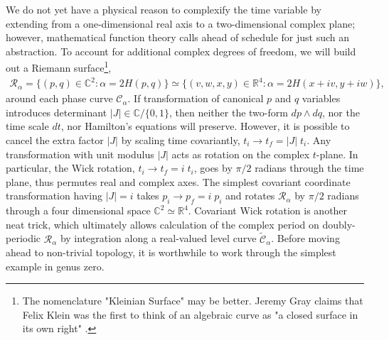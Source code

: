 \documentclass[nofootinbib,preprint]{revtex4-1}
\begin{document}
We do not yet have a physical reason to complexify the time variable by extending from a one-dimensional
real axis to a two-dimensional complex plane; however, mathematical function theory calls ahead of 
schedule for just such an abstraction. To account for additional complex degrees of freedom, we will build 
out a Riemann surface\footnote{The nomenclature "Kleinian Surface" may be better. Jeremy Gray claims that 
Felix Klein was the first to think of an algebraic curve as "a closed surface in its own right" \cite{GRAY2010}. }, 
\begin{eqnarray}
\mathcal{R}_{\alpha} = \{(p,q) \in \mathbb{C}^2: \alpha=2H(p,q) \} 
\simeq \{(v,w,x,y) \in \mathbb{R}^4: \alpha=2H(x+i v,y+i w) \},\nonumber
\end{eqnarray}
around each phase curve $\mathcal{C}_{\alpha}$. If transformation of canonical $p$ and $q$ 
variables introduces determinant $|J| \in \mathbb{C}/\{0,1\}$, then neither the two-form 
$dp \wedge dq$, nor the time scale $dt$, nor Hamilton's equations will preserve. However, 
it is possible to cancel the extra factor $|J|$ by scaling time covariantly, 
$t_i \rightarrow t_f = |J|\;t_i$. Any transformation with unit modulus $|J|$ acts as 
rotation on the complex $t$-plane. In particular, the Wick rotation,  
$t_i\rightarrow t_f = i \; t_i$, goes by $\pi/2$ radians through the time plane, 
thus permutes real and complex axes. The simplest covariant coordinate transformation
having $|J|=i$ takes $p_i\rightarrow p_f=i\;p_i$ and rotates $\mathcal{R}_{\alpha}$  by 
$\pi/2$ radians through a four dimensional space $\mathbb{C}^2 \simeq \mathbb{R}^4$.
Covariant Wick rotation is another neat trick, which ultimately allows calculation of 
the complex period on doubly-periodic $\mathcal{R}_{\alpha}$ by integration along a 
real-valued level curve $\widetilde{\mathcal{C}}_{\alpha}$. Before moving ahead to non-trivial 
topology, it is worthwhile to work through the simplest example in genus zero.
\end{document}

